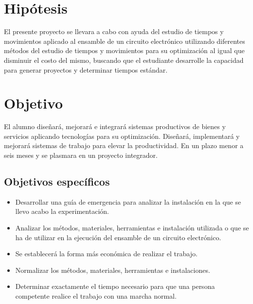     \section{Hipótesis}
    
    El presente proyecto se llevara a cabo con ayuda del estudio de tiempos y movimientos aplicado al ensamble de un circuito electrónico utilizando diferentes métodos del estudio de tiempos y movimientos para su optimización al igual que disminuir el costo del mismo, buscando que el estudiante desarrolle la capacidad para generar proyectos y determinar tiempos estándar. 
    \section{Objetivo}
    El alumno diseñará, mejorará e integrará sistemas productivos de bienes y servicios aplicando tecnologías para su optimización.
    Diseñará, implementará y mejorará sistemas de trabajo para elevar la productividad.
    En un plazo menor a seis meses y se plasmara en un proyecto integrador.
    \subsection{Objetivos específicos}
    \begin{itemize}
        \item Desarrollar una guía de emergencia para analizar la instalación en la que se llevo acabo la experimentación.
        \item Analizar los métodos, materiales, herramientas e instalación utilizada o que se ha de utilizar en la ejecución del ensamble de un circuito electrónico.
        \item Se establecerá la forma más económica de realizar el trabajo.
        \item Normalizar los métodos, materiales, herramientas e instalaciones.
        \item Determinar exactamente el tiempo necesario para que una persona competente realice el trabajo con una marcha normal.
    \end{itemize}
